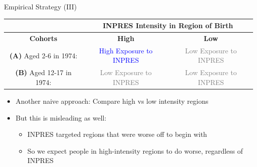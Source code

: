 \documentclass[11pt,notes=hide,aspectratio=169,mathserif]{beamer}
\begin{document}
\begin{frame}{Empirical Strategy (III)}
\begin{table}
\scriptsize
\centering
\begin{tabular}{|c|c|c|}
\hline
    & \multicolumn{2}{|c|}{\textbf{INPRES Intensity in Region of Birth}}  \\
    \hline
    \textbf{Cohorts} & \textbf{High} & \textbf{Low}  \\
\hline 
\textbf{(A)} Aged 2-6 in 1974:  & \rule{0pt}{15pt}  \textcolor{blue}{High Exposure to INPRES} & \rule{0pt}{15pt} \textcolor{gray}{Low Exposure to INPRES} \\
\hline
\textbf{(B)} Aged 12-17 in 1974:  & \rule{0pt}{15pt} \textcolor{gray}{Low Exposure to INPRES} & \rule{0pt}{15pt} \textcolor{gray}{Low Exposure to INPRES} \\
\hline
\end{tabular}
\end{table}

\begin{itemize}
    \item  Another naive approach: Compare high vs low intensity regions 
    \item  But this is misleading as well:
    \begin{itemize}
        \item  INPRES targeted regions that were worse off to begin with
        \item  So we expect people in high-intensity regions to do worse, regardless of INPRES
    \end{itemize} 
\end{itemize}
\end{frame}
\end{document}
